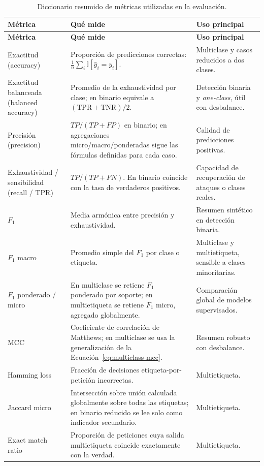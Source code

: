 \documentclass[12pt,oneside]{report}
\newcommand{\ind}{\mathbb{I}} %
\begin{document}
\begin{longtable}{@{}L{0.24\textwidth}L{0.43\textwidth}L{0.25\textwidth}@{}}
\caption{Diccionario resumido de métricas utilizadas en la evaluación.}\label{tab:diccionario-metricas}\\
\toprule
\textbf{Métrica} & \textbf{Qué mide} & \textbf{Uso principal} \\
\midrule
\endfirsthead
\toprule
\textbf{Métrica} & \textbf{Qué mide} & \textbf{Uso principal} \\
\midrule
\endhead
Exactitud (accuracy) & Proporción de predicciones correctas: $\frac{1}{n}\sum_i \ind[\hat y_i=y_i]$. & Multiclase y casos reducidos a dos clases. \\
Exactitud balanceada (balanced accuracy) & Promedio de la exhaustividad por clase; en binario equivale a $(\mathrm{TPR}+\mathrm{TNR})/2$. & Detección binaria y \textit{one-class}, útil con desbalance. \\
Precisión (precision) & $TP/(TP+FP)$ en binario; en agregaciones micro/macro/ponderadas sigue las fórmulas definidas para cada caso. & Calidad de predicciones positivas. \\
Exhaustividad / sensibilidad (recall / TPR) & $TP/(TP+FN)$. En binario coincide con la tasa de verdaderos positivos. & Capacidad de recuperación de ataques o clases reales. \\
$F_1$ & Media armónica entre precisión y exhaustividad. & Resumen sintético en detección binaria. \\
$F_1$ macro & Promedio simple del $F_1$ por clase o etiqueta. & Multiclase y multietiqueta, sensible a clases minoritarias. \\
$F_1$ ponderado / micro & En multiclase se retiene $F_1$ ponderado por soporte; en multietiqueta se retiene $F_1$ micro, agregado globalmente. & Comparación global de modelos supervisados. \\
MCC & Coeficiente de correlación de Matthews; en multiclase se usa la generalización de la Ecuación~\eqref{eq:multiclass-mcc}. & Resumen robusto con desbalance. \\
Hamming loss & Fracción de decisiones etiqueta-por-petición incorrectas. & Multietiqueta. \\
Jaccard micro & Intersección sobre unión calculada globalmente sobre todas las etiquetas; en binario reducido se lee solo como indicador secundario. & Multietiqueta. \\
Exact match ratio & Proporción de peticiones cuya salida multietiqueta coincide exactamente con la verdad. & Multietiqueta. \\

\end{longtable}
\end{document}
